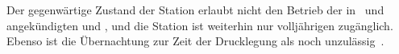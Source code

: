 \begin{newstuff}
    Der gegenwärtige Zustand der Station erlaubt nicht den Betrieb der in~\cite{ctour} und~\cite{cbasestarbasemanual} angekündigten  und , und die Station ist weiterhin nur volljährigen zugänglich. Ebenso ist die Übernachtung zur Zeit der Drucklegung als  noch unzulässig~\cite[S. 58]{cbasebook}.
\end{newstuff}